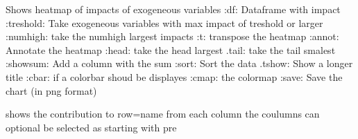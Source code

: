 \documentclass[letterpaper,10pt,english]{sphinxmanual}
\begin{document}
\begin{fulllineitems}
\label{\detokenize{index:modelvis.attshow}}
\pysigstartsignatures
{}
\pysigstopsignatures
\sphinxAtStartPar
Shows heatmap of impacts of exogeneous variables
:df: Dataframe with impact
:treshold: Take exogeneous variables with max impact of treshold or larger
:numhigh: take the numhigh largest impacts
:t: transpose the heatmap
:annot: Annotate the heatmap
:head: take the head largest
.tail: take the tail smalest
:showsum: Add a column with the sum
:sort: Sort the data
.tshow: Show a longer title
:cbar:  if a colorbar shoud be displayes
:cmap: the colormap
:save: Save the chart (in png format)

\end{fulllineitems}


\begin{fulllineitems}
\label{\detokenize{index:modelvis.attshowone}}
\pysigstartsignatures
{}
\pysigstopsignatures
\sphinxAtStartPar
shows the contribution to row=name from each column
the coulumns can optional be selected as starting with pre

\end{fulllineitems}
\end{document}
